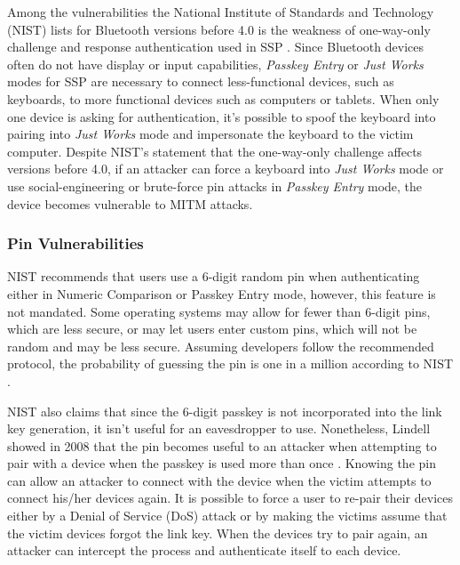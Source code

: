 \documentclass{acm_proc_article-sp}
\begin{document}
Among the vulnerabilities the National Institute of Standards and Technology (NIST) lists for Bluetooth versions before 4.0 is the weakness of one-way-only challenge and response authentication used in SSP \cite{scarfone2008guide}. Since Bluetooth devices often do not have display or input capabilities, \textit{Passkey Entry} or \textit{Just Works} modes for SSP are necessary to connect less-functional devices, such as keyboards, to more functional devices such as computers or tablets. When only one device is asking for authentication, it's possible to spoof the keyboard into pairing into \textit{Just Works} mode and impersonate the keyboard to the victim computer. Despite NIST's statement that the one-way-only challenge affects versions before 4.0, if an attacker can force a keyboard into \textit{Just Works} mode or use social-engineering or brute-force pin attacks in \textit{Passkey Entry} mode, the device becomes vulnerable to MITM attacks.

\subsubsection{Pin Vulnerabilities}
NIST recommends that users use a 6-digit random pin when authenticating either in Numeric Comparison or Passkey Entry mode, however, this feature is not mandated. Some operating systems may allow for fewer than 6-digit pins, which are less secure, or may let users enter custom pins, which will not be random and may be less secure. Assuming developers follow the recommended protocol, the probability of guessing the pin is one in a million according to NIST \cite{scarfone2008guide}. 

NIST also claims that since the 6-digit passkey is not incorporated into the link key generation, it isn't useful for an eavesdropper to use. Nonetheless, Lindell showed in 2008 that the pin becomes useful to an attacker when attempting to pair with a device when the passkey is used more than once \cite{lindell2008attacks}. Knowing the pin can allow an attacker to connect with the device when the victim attempts to connect his/her devices again. It is possible to force a user to re-pair their devices either by a Denial of Service (DoS) attack \cite{cuthbertbluetooth} or by making the victims assume that the victim devices forgot the link key\cite{shaked2005cracking}. When the devices try to pair again, an attacker can intercept the process and authenticate itself to each device. 
\end{document}

